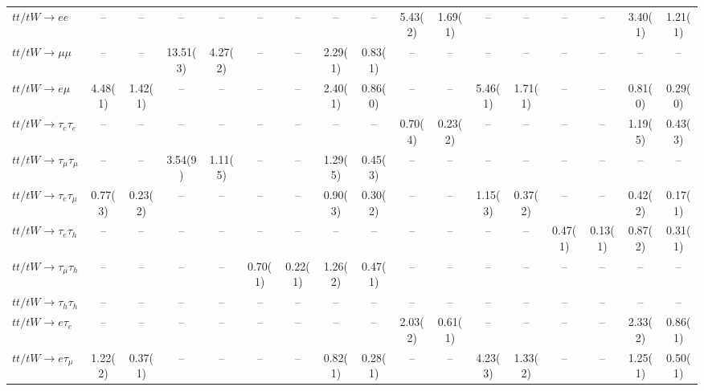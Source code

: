 \begin{sidewaystable}[p]
\begin{tabular}{|l|cc|cc|cc|cc|cc|cc|cc|cc|}
    $tt/tW \to ee$                     &    --    &    --    &    --    &    --    &    --    &    --    &    --    &    --    &  5.43(2) &  1.69(1) &    --    &    --    &    --    &    --    &  3.40(1) &  1.21(1) \\ 
    $tt/tW \to \mu\mu$                 &    --    &    --    & 13.51(3) &  4.27(2) &    --    &    --    &  2.29(1) &  0.83(1) &    --    &    --    &    --    &    --    &    --    &    --    &    --    &    --    \\ 
    $tt/tW \to e\mu$                   &  4.48(1) &  1.42(1) &    --    &    --    &    --    &    --    &  2.40(1) &  0.86(0) &    --    &    --    &  5.46(1) &  1.71(1) &    --    &    --    &  0.81(0) &  0.29(0) \\ 
    $tt/tW \to \tau_{e}\tau_{e}$       &    --    &    --    &    --    &    --    &    --    &    --    &    --    &    --    &  0.70(4) &  0.23(2) &    --    &    --    &    --    &    --    &  1.19(5) &  0.43(3) \\ 
    $tt/tW \to \tau_{\mu}\tau_{\mu}$   &    --    &    --    &  3.54(9) &  1.11(5) &    --    &    --    &  1.29(5) &  0.45(3) &    --    &    --    &    --    &    --    &    --    &    --    &    --    &    --    \\ 
    $tt/tW \to \tau_{e}\tau_{\mu}$     &  0.77(3) &  0.23(2) &    --    &    --    &    --    &    --    &  0.90(3) &  0.30(2) &    --    &    --    &  1.15(3) &  0.37(2) &    --    &    --    &  0.42(2) &  0.17(1) \\ 
    $tt/tW \to \tau_{e}\tau_{h}$       &    --    &    --    &    --    &    --    &    --    &    --    &    --    &    --    &    --    &    --    &    --    &    --    &  0.47(1) &  0.13(1) &  0.87(2) &  0.31(1) \\ 
    $tt/tW \to \tau_{\mu}\tau_{h}$     &    --    &    --    &    --    &    --    &  0.70(1) &  0.22(1) &  1.26(2) &  0.47(1) &    --    &    --    &    --    &    --    &    --    &    --    &    --    &    --    \\ 
    $tt/tW \to \tau_{h}\tau_{h}$       &    --    &    --    &    --    &    --    &    --    &    --    &    --    &    --    &    --    &    --    &    --    &    --    &    --    &    --    &    --    &    --    \\ 
    $tt/tW \to e\tau_{e}$              &    --    &    --    &    --    &    --    &    --    &    --    &    --    &    --    &  2.03(2) &  0.61(1) &    --    &    --    &    --    &    --    &  2.33(2) &  0.86(1) \\ 
    $tt/tW \to e\tau_{\mu}$            &  1.22(2) &  0.37(1) &    --    &    --    &    --    &    --    &  0.82(1) &  0.28(1) &    --    &    --    &  4.23(3) &  1.33(2) &    --    &    --    &  1.25(1) &  0.50(1) \\ 

\end{tabular}
\end{sidewaystable}

